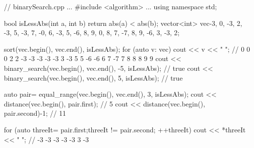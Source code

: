 \begin{cpp}
// binarySearch.cpp
...
#include <algorithm>
...
using namespace std;

bool isLessAbs(int a, int b){
	return abs(a) < abs(b);
}
vector<int> vec{-3, 0, -3, 2, -3, 5, -3, 7, -0, 6, -3, 5,
				-6, 8, 9, 0, 8, 7, -7, 8, 9, -6, 3, -3, 2};

sort(vec.begin(), vec.end(), isLessAbs);
for (auto v: vec) cout << v << " ";
	// 0 0 0 2 2 -3 -3 -3 -3 -3 3 -3 5 5 -6 -6 6 7 -7 7 8 8 8 9 9
cout << binary_search(vec.begin(), vec.end(), -5, isLessAbs); // true
cout << binary_search(vec.begin(), vec.end(), 5, isLessAbs); // true

auto pair= equal_range(vec.begin(), vec.end(), 3, isLessAbs);
cout << distance(vec.begin(), pair.first); // 5
cout << distance(vec.begin(), pair.second)-1; // 11

for (auto threeIt= pair.first;threeIt != pair.second; ++threeIt)
	cout << *threeIt << " "; // -3 -3 -3 -3 -3 3 -3
\end{cpp}
























